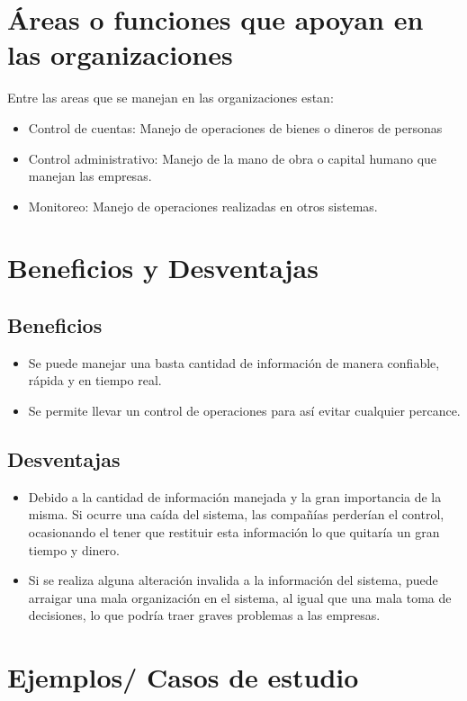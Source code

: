 \section {Áreas o funciones que apoyan en las organizaciones}

Entre las areas que se manejan en las organizaciones estan:
\begin{itemize}
\item Control de cuentas:	Manejo de operaciones de bienes o dineros de personas
\item Control administrativo: Manejo de la mano de obra o capital humano que manejan las empresas.
\item Monitoreo: Manejo de operaciones realizadas en otros sistemas.
\end{itemize}

\section {Beneficios y Desventajas}

\subsection{Beneficios}
\begin{itemize}
\item Se puede manejar una basta cantidad de información de manera confiable, rápida y en tiempo real.
\item Se permite llevar un control de operaciones para así evitar cualquier percance.
\end{itemize}

\subsection{Desventajas}
\begin{itemize}
\item Debido a la cantidad de información manejada y la gran importancia de la misma. Si ocurre una caída del sistema, las compañías perderían el control, ocasionando el tener que restituir esta información lo que quitaría un gran tiempo y dinero.
\item Si se realiza alguna alteración invalida a la información del sistema, puede arraigar una mala organización en el sistema, al igual que una mala toma de decisiones, lo que podría traer graves problemas a las empresas.
\end{itemize}

\section {Ejemplos/ Casos de estudio}
